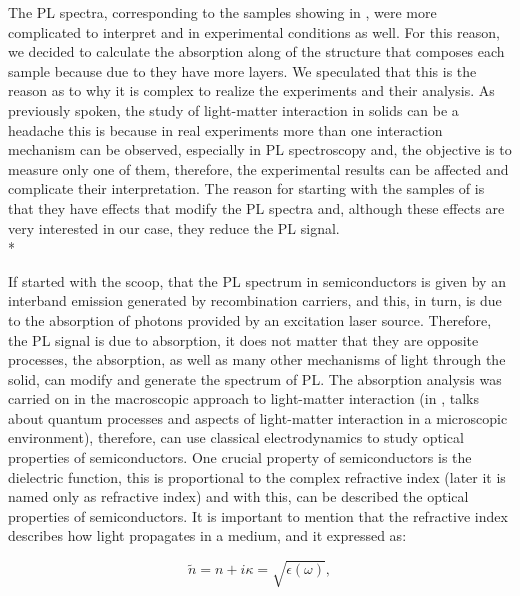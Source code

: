 The PL spectra, corresponding to the samples showing in ,  were more complicated to interpret and in experimental conditions as well. For this reason, we decided to calculate the absorption along of the structure that composes each sample because due to they have more layers. We speculated that this is the reason as to why it is  complex to realize the experiments and their analysis. As previously spoken, the study of light-matter interaction in solids can be a headache this is because in real experiments more than one interaction mechanism can be observed, especially in PL spectroscopy and, the objective is to measure only one of them, therefore, the experimental results can be affected and complicate their interpretation. The reason for starting with the samples of  is that they have effects that modify the PL spectra and, although these effects are very interested in our case, they reduce the PL signal.\\* 


If started with the scoop, that the PL spectrum in semiconductors is given by an interband emission generated by recombination carriers, and this, in turn, is due to the absorption of photons provided by an excitation laser source. Therefore, the PL signal is due to absorption, it does not matter that they are opposite processes, the absorption, as well as many other mechanisms of light through the solid, can modify and generate the spectrum of PL. The absorption analysis was carried on in the macroscopic approach to light-matter interaction (in , talks about quantum processes and aspects of light-matter interaction in a microscopic environment), therefore,   can use classical electrodynamics to study optical properties of semiconductors. One crucial property of semiconductors is the dielectric function, this is proportional to the complex refractive index (later it is named only as refractive index) and with this,  can be described the optical properties of semiconductors. It is important to mention that the refractive index describes how light propagates  in a medium, and it expressed as\cite{chuang1995physics,jimenez2016spectroscopic}:

\begin{equation}
	\tilde{n}=n + i\kappa = \sqrt{\epsilon(\omega)},
	\label{eq:chapter-3-PL-complex-refractive-index}
\end{equation}

